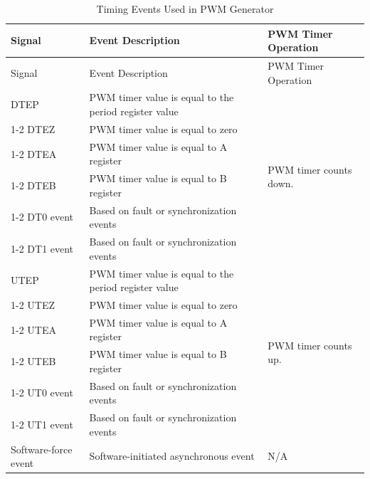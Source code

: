 \begin{longtable}{ |p{3.6cm}|p{8cm}|p{4cm}|}
    \caption{ Timing Events Used in PWM Generator}
    \label{table:gen_in}
    \\\hline
    \rowcolor{lightgray}
    Signal & Event Description & PWM Timer Operation \\\hline
    \endfirsthead
    \hline
    \rowcolor{lightgray}   
    Signal & Event Description & PWM Timer Operation \\\hline
    \endhead
    \hline
    \endfoot
    DTEP 
    & PWM timer value is equal to the period register value
    & \multirow{6}{*}{PWM timer counts down.}
    \\
    \cline{1-2}
    DTEZ
    & PWM timer value is equal to zero
    & 
    \\
    \cline{1-2}
    DTEA
    & PWM timer value is equal to A register
    & 
    \\
    \cline{1-2}
    DTEB
    & PWM timer value is equal to B register
    & 
    \\
    \cline{1-2}
    DT0 event
    & Based on fault or synchronization events
    & 
    \\
    \cline{1-2}
    DT1 event
    & Based on fault or synchronization events
    & 
    \\\hline
    UTEP
    & PWM timer value is equal to the period register value
    & \multirow{6}{*}{PWM timer counts up.}
    \\
    \cline{1-2}
    UTEZ
    & PWM timer value is equal to zero
    & 
    \\
    \cline{1-2}
    UTEA
    & PWM timer value is equal to A register
    & 
    \\
    \cline{1-2}
    UTEB
    & PWM timer value is equal to B register
    & 
    \\
    \cline{1-2}
    UT0 event
    & Based on fault or synchronization events
    & 
    \\
    \cline{1-2}
    UT1 event
    & Based on fault or synchronization events
    & 
    \\\hline
    Software-force event 
    & Software-initiated asynchronous event 
    & N/A
\end{longtable}